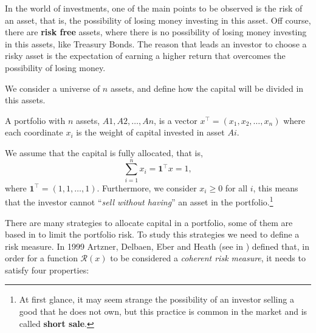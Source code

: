 In the world of investments, one of the main points to be observed is the risk of an asset, that is, the possibility of losing money investing in this asset. Off course, there are \textbf{risk free} assets, where there is no possibility of losing money investing in this assets, like Treasury Bonds. The reason that leads an investor to choose a risky asset is the expectation of earning a higher return that overcomes the possibility of losing money.

We consider a universe of $n$ assets, and define how the capital will be divided in this assets.

\begin{definition}
	A portfolio with $n$ assets, $A1, A2, \dots, An$, is a vector $x^\top = (x_1, x_2, \dots, x_n)$ where each coordinate $x_i$ is the weight of capital invested in asset $Ai$.
\end{definition}

We assume that the capital is fully allocated, that is,
$$
	\sum_{i=1}^n x_i = \textbf{1}^\top x=1,
$$
where $ \mathbf{1}^\top= (1,1,\dots,1)$. Furthermore, we consider $x_i\geq 0$ for all $i$, this means that the investor cannot ``\textit{sell without having}'' an asset in the portfolio.\footnote{At first glance, it may seem strange the possibility of an investor selling a good that he does not own, but this practice is common in the market and is called \textbf{short sale}.}


There are many strategies to allocate capital in a portfolio, some of them are based in to limit the portfolio risk. To study this strategies we need to define a risk measure. In 1999 Artzner, Delbaen, Eber and Heath (see in \cite{Artzner1999}) defined that, in order for a function $\mathcal{R}(x)$ to be considered a \emph{coherent risk measure}, it needs to satisfy four properties:

